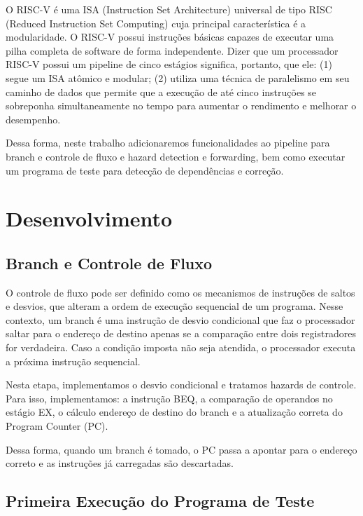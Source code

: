 \documentclass{sbc2023}%
\begin{document}
O RISC-V é uma ISA (Instruction Set Architecture) universal de tipo RISC (Reduced Instruction Set Computing) cuja principal característica é a modularidade. O RISC-V possui instruções básicas capazes de executar uma pilha completa de software de forma independente. Dizer que um processador RISC-V possui um pipeline de cinco estágios significa, portanto, que ele: (1) segue um ISA atômico e modular; (2) utiliza uma técnica de paralelismo em seu caminho de dados que permite que a execução de até cinco instruções se sobreponha simultaneamente no tempo para aumentar o rendimento e melhorar o desempenho. \citep{patterson2017riscv}

Dessa forma, neste trabalho adicionaremos funcionalidades ao pipeline para branch e controle de fluxo e hazard detection e forwarding, bem como executar um programa de teste para detecção de dependências e correção.

\section{Desenvolvimento}

\subsection{Branch e Controle de Fluxo}

O controle de fluxo pode ser definido como os mecanismos de instruções de saltos e desvios, que alteram a ordem de execução sequencial de um programa. Nesse contexto, um branch é uma instrução de desvio condicional que faz o processador saltar para o endereço de destino apenas se a comparação entre dois registradores for verdadeira. Caso a condição imposta não seja atendida, o processador executa a próxima instrução sequencial. \cite{patterson2017riscv}

Nesta etapa, implementamos o desvio condicional e tratamos hazards de controle. Para isso, implementamos: a instrução BEQ, a comparação de  operandos no estágio EX, o cálculo endereço de destino do branch e a atualização correta do Program Counter (PC).

Dessa forma, quando um branch é tomado, o PC passa a apontar para o endereço correto e as instruções já carregadas são descartadas.

\subsection{Primeira Execução do Programa de Teste}
\end{document}
